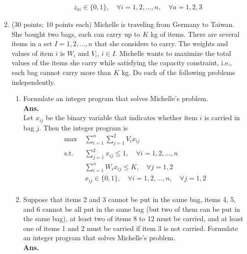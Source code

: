 \documentclass[14pt]{article}
\begin{document}
\begin{enumerate}
\begin{enumerate}
\begin{align*}
                                           & z_{ai} \in \{0, 1\}, \quad \forall i = 1, 2, ..., n, \quad \forall a = 1, 2, 3
                        \end{align*}
            \end{enumerate}
      \item (30 points; 10 points each) Michelle is traveling from Germany to Taiwan. She bought two bags, each can carry up to $K$ kg of items. There are several items in a set $I = {1,2,...,n}$ that she considers to carry. The weights and values of item $i$ is $W_i$ and $V_i$, $i \in I$. Michelle wants to maximize the total values of the items she carry while satisfying the capacity constraint, i.e., each bag cannot carry more than $K$ kg. Do each of the following problems independently.
            \begin{enumerate}
                  \item Formulate an integer program that solves Michelle’s problem.\\
                        \textbf{Ans. }\\
                        Let $x_{ij}$ be the binary variable that indicates whether item $i$ is carried in bag $j$. Then the integer program is
                        \begin{align*}
                              \text{max }  & \sum_{i=1}^n\sum_{j=1}^2 V_ix_{ij}                                          \\
                              \text{s.t. } & \sum_{j=1}^2 x_{ij} \leq 1, \quad \forall i = 1, 2, ..., n                  \\
                                           & \sum_{i=1}^n W_ix_{ij} \leq K, \quad \forall j = 1, 2                       \\
                                           & x_{ij} \in \{0, 1\}, \quad \forall i = 1, 2, ..., n, \quad \forall j = 1, 2 \\
                        \end{align*}
                  \item Suppose that items 2 and 3 cannot be put in the same bag, items 4, 5, and 6 cannot be all put in the same bag (but two of them can be put in the same bag), at least two of items 8 to 12 must be carried, and at least one of items 1 and 2 must be carried if item 3 is not carried. Formulate an integer program that solves Michelle’s problem.\\
                        \textbf{Ans. }
                        \begin{align*}

\end{align*}
\end{enumerate}
\end{enumerate}
\end{document}
